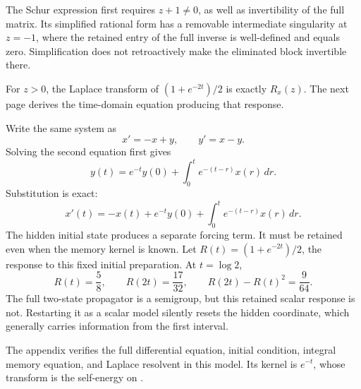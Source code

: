 The Schur expression first requires $z+1\ne0$, as well as invertibility of the full matrix. Its simplified rational form has a removable intermediate singularity at $z=-1$, where the retained entry of the full inverse is well-defined and equals zero. Simplification does not retroactively make the eliminated block invertible there.

For $z>0$, the Laplace transform of $(1+e^{-2t})/2$ is exactly $R_x(z)$. The next page derives the time-domain equation producing that response.

Write the same system as
\[
x'=-x+y,\qquad y'=x-y.
\]
Solving the second equation first gives
\[
y(t)=e^{-t}y(0)+\int_0^t e^{-(t-r)}x(r)\,dr.
\]
Substitution is exact:
\[
x'(t)=-x(t)+e^{-t}y(0)+\int_0^t e^{-(t-r)}x(r)\,dr.
\]
The hidden initial state produces a separate forcing term. It must be retained even when the memory kernel is known.
Let $R(t)=(1+e^{-2t})/2$, the response to this fixed initial preparation. At $t=\log2$,
\[
R(t)=\frac58,\qquad R(2t)=\frac{17}{32},
\qquad R(2t)-R(t)^2=\frac9{64}.
\]
The full two-state propagator is a semigroup, but this retained scalar response is not. Restarting it as a scalar model silently resets the hidden coordinate, which generally carries information from the first interval.

The appendix verifies the full differential equation, initial condition, integral memory equation, and Laplace resolvent in this model. Its kernel is $e^{-t}$, whose transform is the self-energy on .

